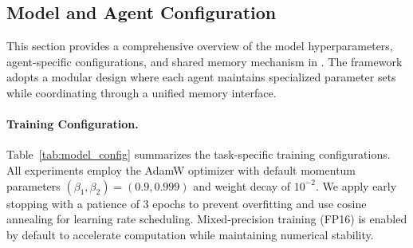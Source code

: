 \subsection{Model and Agent Configuration}
\label{appx:model_agent_config}

This section provides a comprehensive overview of the model hyperparameters, agent-specific configurations, and shared memory mechanism in \model. The framework adopts a modular design where each agent maintains specialized parameter sets while coordinating through a unified memory interface.

\paragraph{Training Configuration.}
Table~\ref{tab:model_config} summarizes the task-specific training configurations. All experiments employ the AdamW optimizer with default momentum parameters $(\beta_1, \beta_2) = (0.9, 0.999)$ and weight decay of $10^{-2}$. We apply early stopping with a patience of 3 epochs to prevent overfitting and use cosine annealing for learning rate scheduling. Mixed-precision training (FP16) is enabled by default to accelerate computation while maintaining numerical stability.


